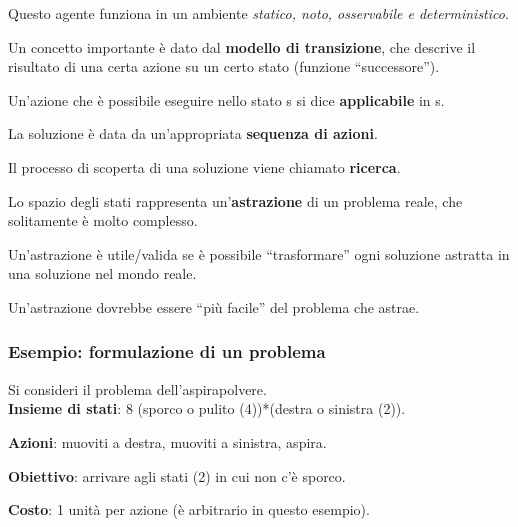 Questo agente funziona in un ambiente \textit{statico, noto, osservabile e
deterministico}.

Un concetto importante è dato dal \textbf{modello di transizione}, che
descrive il risultato di una certa azione su un certo stato
(funzione ``successore'').

Un'azione che è possibile eseguire nello stato s si dice \textbf{applicabile}
in s.

La soluzione è data da un'appropriata \textbf{sequenza di azioni}.

Il processo di scoperta di una soluzione viene chiamato \textbf{ricerca}.

Lo spazio degli stati rappresenta un'\textbf{astrazione} di un problema reale,
che solitamente è molto complesso.

Un'astrazione è utile/valida se è possibile ``trasformare'' ogni soluzione
astratta in una soluzione nel mondo reale.

Un'astrazione dovrebbe essere ``più facile'' del problema che astrae.

\subsubsection{Esempio: formulazione di un problema}

Si consideri il problema dell'aspirapolvere. \\

\textbf{Insieme di stati}: 8 (sporco o pulito (4))*(destra o sinistra (2)).

\textbf{Azioni}: muoviti a destra, muoviti a sinistra, aspira.

\textbf{Obiettivo}: arrivare agli stati (2) in cui non c'è sporco.

\textbf{Costo}: 1 unità per azione (è arbitrario in questo esempio).








